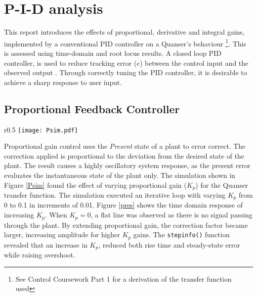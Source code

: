 \section{P-I-D analysis}\label{p-i-d-analysis}

This report introduces the effects of proportional, derivative and
integral gains, implemented by a conventional PID controller on a
Quanser's behaviour
\footnote{See Control Coursework Part 1 for a derivation of the transfer function used}.
This is assessed using time-domain and root locus results. A closed loop
PID controller, is used to reduce tracking error (\(e\)) between the
control input and the observed output \cite{ControlT54:online}. Through
correctly tuning the PID controller, it is desirable to achieve a sharp
response to user input.

\subsection{Proportional Feedback
Controller}\label{proportional-feedback-controller}

\begin{wrapfigure}{r}{0.5\textwidth}
\centering
\vspace{-35pt} %
\texttt{[image: Psim.pdf]}
\vspace{-25pt}
\caption{Proportional Feedback Controller}
\label{Psim}
\vspace{-15pt}
\end{wrapfigure}

Proportional gain control uses the \emph{Present} state of a plant to
error correct. The correction applied is proportional to the deviation
from the desired state of the plant. The result causes a highly
oscillatory system response, as the present error evaluates the
instantaneous state of the plant only. The simulation shown in Figure
\ref{Psim} found the effect of varying proportional gain (\(K_p\)) for
the Quanser transfer function. The simulation executed an iterative loop
with varying \(K_p\) from 0 to 0.1 in increments of 0.01. Figure
\ref{pres} shows the time domain response of increasing \(K_p\). When
\(K_p = 0\), a flat line was observed as there is no signal passing
through the plant. By extending proportional gain, the correction factor
became larger, increasing amplitude for higher \(K_p\) gains. The
\texttt{stepinfo()} function revealed that an increase in \(K_p\),
reduced both rise time and steady-state error while raising overshoot.

